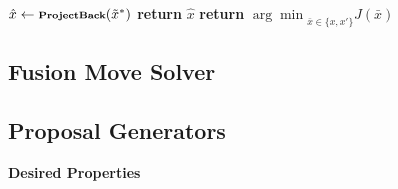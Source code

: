 \documentclass[10pt,twocolumn,letterpaper]{article}
\begin{document}
\begin{algorithm}
\begin{scriptsize}
\begin{algorithmic}[1]
\State $\hat{x} \gets \textbf{\scriptsize{ProjectBack}}(\tilde{x}^*)$
\State \textbf{return} $\hat{x}$
\EndProcedure
\vspace{0.3cm}
\State \textbf{return} ${\arg\min}_{\bar{x} \in \{x,x'\}}J(\bar{x})$
\EndProcedure
\end{algorithmic}
\end{scriptsize}
\end{algorithm}






\subsection{Fusion Move Solver}



\subsection{Proposal Generators}

\textbf{Desired Properties}
\end{document}
